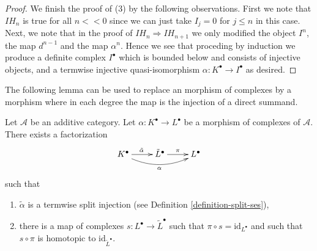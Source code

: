 \begin{proof}
\medskip\noindent
We finish the proof of (3) by the following observations.
First we note that $IH_n$ is true for all $n << 0$ since
we can just take $I_j = 0$ for $j \leq n$ in this case.
Next, we note that in the proof of $IH_n \Rightarrow IH_{n + 1}$
we only modified the object $I^n$, the map $d^{n - 1}$ and
the map $\alpha^n$. Hence we see that proceding by induction
we produce a definite complex $I^\bullet$ which is bounded below
and consists of injective objects, and a termwise
injective quasi-isomorphism $\alpha : K^\bullet \to I^\bullet$ as desired.
\end{proof}

\noindent
The following lemma can be used to replace an morphism of complexes
by a morphism where in each degree the map is the injection of a
direct summand.

\begin{lemma}
\label{lemma-make-injective}
Let $\mathcal{A}$ be an additive category.
Let $\alpha : K^\bullet \to L^\bullet$ be a morphism
of complexes of $\mathcal{A}$.
There exists a factorization
$$
\xymatrix{
K^\bullet \ar[r]^{\tilde \alpha} \ar@/_1pc/[rr]_\alpha &
\tilde L^\bullet \ar[r]^\pi &
L^\bullet
}
$$
such that
\begin{enumerate}
\item $\tilde \alpha$ is a termwise split injection (see
Definition \ref{definition-split-ses}),
\item there is a map of complexes $s : L^\bullet \to \tilde L^\bullet$
such that $\pi \circ s = \text{id}_{L^\bullet}$ and such that
$s \circ \pi$ is homotopic to $\text{id}_{\tilde L^\bullet}$.
\end{enumerate}
\end{lemma}

